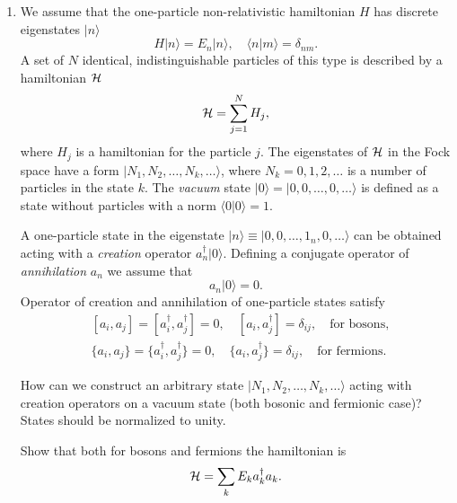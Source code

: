 \documentclass[a4paper,11pt]{article}
\begin{document}
\begin{enumerate}
\item We assume that the one-particle non-relativistic hamiltonian $H$
  has discrete eigenstates $| n \rangle$
  \begin{equation}
    \label{eq:1}
    H | n \rangle = E_{ n } | n \rangle, \quad
    \langle n | m \rangle = \delta_{ n m }.
  \end{equation}
  A set of $N$ identical, indistinguishable particles of this type is
  described by a hamiltonian $\mathcal{H}$
  \begin{equation}
    \label{eq:2}
    \mathcal{H} = \sum_{ j = 1 }^{ N } H_{ j },
  \end{equation}
  where $H_{ j }$ is a hamiltonian for the particle $j$. The
  eigenstates of $\mathcal{H}$ in the Fock space have a form
  $| N_{ 1 }, N_{ 2 }, \ldots, N_{ k }, \ldots \rangle$, where
  $N_{ k } = 0, 1, 2, \ldots$ is a number of particles in the state
  $k$. The \textit{vacuum} state
  $| 0 \rangle = | 0, 0, \ldots, 0, \ldots \rangle$ is defined as a state without particles
  with a norm $\langle 0 | 0 \rangle = 1$.

  A one-particle state in the eigenstate
  $| n \rangle \equiv | 0, 0, \ldots, 1_{ n }, 0, \ldots \rangle$ can be obtained acting
  with a \textit{creation} operator $a_{ n }^{ \dagger } | 0 \rangle$. Defining a
  conjugate operator of \textit{annihilation} $a_{ n }$ we assume that
  \begin{equation}
    \label{eq:3}
    a_{ n } | 0 \rangle = 0.
  \end{equation}
  Operator of creation and annihilation of one-particle states satisfy
  \begin{align}
    &[ a_{ i }, a_{ j } ] = [ a_{ i }^{ \dagger }, a_{ j }^{ \dagger } ] = 0, \quad
      [ a_{ i }, a_{ j }^{ \dagger } ] = \delta_{ i j }, \quad
      \textrm{for bosons}, \\
    &\{ a_{ i }, a_{ j } \} = \{ a_{ i }^{ \dagger }, a_{ j }^{ \dagger } \} = 0, \quad
      \{ a_{ i }, a_{ j }^{ \dagger } \} = \delta_{ i j }, \quad
      \textrm{for fermions}.
  \end{align}

  How can we construct an arbitrary state
  $| N_{ 1 }, N_{ 2 }, \ldots, N_{ k }, \ldots \rangle$ acting with creation operators
  on a vacuum state (both bosonic and fermionic case)? States should
  be normalized to unity.

  Show that both for bosons and fermions the hamiltonian is
  \begin{equation}
    \label{eq:19}
    \mathcal{H} = \sum_{ k } E_{ k } a_{ k }^{ \dagger } a_{ k }.
  \end{equation}


\end{enumerate}
\end{document}
